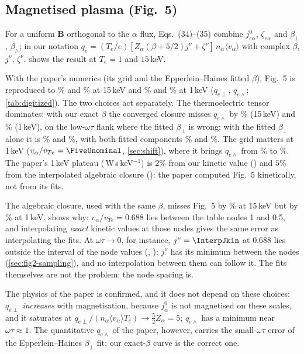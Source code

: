 \documentclass[11pt,a4paper]{article}
\newcommand{\ot}{\omega\tau}
\begin{document}
\subsection{Magnetised plasma (Fig.~5)}\label{sec:fig5}
For a uniform $\mathbf B$ orthogonal to the $\alpha$ flux, Eqs.~(34)--(35) combine $j^0_{e\alpha}$, $\zeta_{e\alpha}$ and
$\beta_\perp$, $\beta_\wedge$; in our notation $q_e=(T_e/e)[Z_\alpha(\beta+5/2)j^\nu+\zeta^\nu]\,n_\alpha\langle
v_\alpha\rangle$ with complex $\beta$, $j^\nu$, $\zeta^\nu$.  shows the result at $T_e=1$ and $15$\,keV.

With the paper's numerics (its grid and the Epperlein--Haines fitted $\beta$), Fig.~5 is reproduced to
\FivePerpFifteenGrid\% and \FiveWedgeFifteenGrid\% at 15\,keV and \FivePerpOneGrid\% and \FiveWedgeOneGrid\% at 1\,keV
($q_{e\perp}$, $q_{e\wedge}$; \cref{tab:digitized}). The two choices act separately. The thermoelectric tensor dominates:
with our exact $\beta$ the converged closure misses $q_{e\wedge}$ by \FiveWedgeFifteenKin\% (15\,keV) and \FiveWedgeOneKin\%
(1\,keV), on the low-$\ot$ flank where the fitted $\beta_\perp$ is wrong; with the fitted $\beta_\perp$ alone it is
\FiveWedgeFifteenEHperp\% and \FiveWedgeOneEHperp\%, with both fitted components \FiveWedgeFifteenEH\% and
\FiveWedgeOneEH\%. The grid matters at 1\,keV ($v_\alpha/v_{Te}=\FiveUnominal$, \cref{sec:shift}), where it brings
$q_{e\wedge}$ from \FiveWedgeOneEH\% to \FiveWedgeOneGrid\%. The paper's 1\,keV plateau (\FivePlateauPaperOne\,W\,s\,keV$^{-1}$)
is $2\%$ from our kinetic value (\FivePlateauKinOne) and $5\%$ from the interpolated algebraic closure
(\FivePlateauFitOne): the paper computed Fig.~5 kinetically, not from its fits.

The algebraic closure, used with the same $\beta$, misses Fig.~5 by \FiveWedgeFifteenFit\% at 15\,keV but by
\FiveWedgeOneFit\% at 1\,keV.  shows why: $v_\alpha/v_{Te}=0.688$ lies between the table nodes 1 and 0.5,
and interpolating \emph{exact} kinetic values at those nodes gives the same error as interpolating the fits. At
$\ot\to0$, for instance, $j^\nu=\InterpJkin$ at $0.688$ lies outside the interval of the node values (\InterpJone,
\InterpJhalf): $j^\nu$ has its minimum between the nodes (\cref{sec:fig2-sampling}), and no interpolation between them can
follow it. The fits themselves are not the problem; the node spacing is.

The physics of the paper is confirmed, and it does not depend on these choices: $q_{e\perp}$ \emph{increases} with
magnetisation, because $j^0_\alpha$ is not magnetised on these scales, and it saturates at
$q_{e\perp}/(n_\alpha\langle v_\alpha\rangle T_e)\to\tfrac52Z_\alpha=5$; $q_{e\wedge}$ has a minimum near $\ot\approx1$.
The quantitative $q_{e\wedge}$ of the paper, however, carries the small-$\ot$ error of the Epperlein--Haines $\beta_\perp$
fit; our exact-$\beta$ curve is the correct one.
\end{document}
